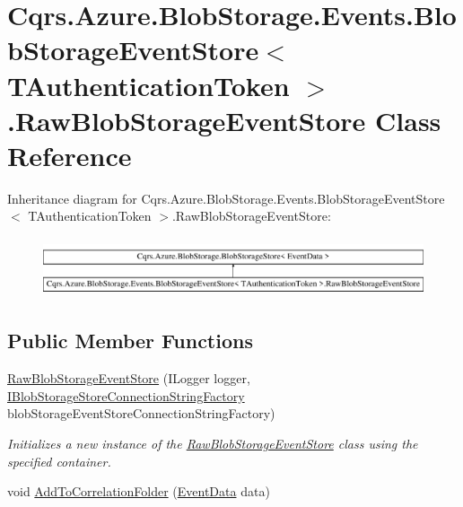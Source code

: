 \hypertarget{classCqrs_1_1Azure_1_1BlobStorage_1_1Events_1_1BlobStorageEventStore_1_1RawBlobStorageEventStore}{}\section{Cqrs.\+Azure.\+Blob\+Storage.\+Events.\+Blob\+Storage\+Event\+Store$<$ T\+Authentication\+Token $>$.Raw\+Blob\+Storage\+Event\+Store Class Reference}
\label{classCqrs_1_1Azure_1_1BlobStorage_1_1Events_1_1BlobStorageEventStore_1_1RawBlobStorageEventStore}
Inheritance diagram for Cqrs.\+Azure.\+Blob\+Storage.\+Events.\+Blob\+Storage\+Event\+Store$<$ T\+Authentication\+Token $>$.Raw\+Blob\+Storage\+Event\+Store\+:\begin{figure}[H]
\begin{center}
\leavevmode
\includegraphics[height=1.755486cm]{classCqrs_1_1Azure_1_1BlobStorage_1_1Events_1_1BlobStorageEventStore_1_1RawBlobStorageEventStore}
\end{center}
\end{figure}
\subsection*{Public Member Functions}
\begin{DoxyCompactItemize}
\item 
\hyperlink{classCqrs_1_1Azure_1_1BlobStorage_1_1Events_1_1BlobStorageEventStore_1_1RawBlobStorageEventStore_a42832e52a20eeb7012526624181f457c_a42832e52a20eeb7012526624181f457c}{Raw\+Blob\+Storage\+Event\+Store} (I\+Logger logger, \hyperlink{interfaceCqrs_1_1Azure_1_1BlobStorage_1_1IBlobStorageStoreConnectionStringFactory}{I\+Blob\+Storage\+Store\+Connection\+String\+Factory} blob\+Storage\+Event\+Store\+Connection\+String\+Factory)
\begin{DoxyCompactList}\small\item\em Initializes a new instance of the \hyperlink{classCqrs_1_1Azure_1_1BlobStorage_1_1Events_1_1BlobStorageEventStore_1_1RawBlobStorageEventStore}{Raw\+Blob\+Storage\+Event\+Store} class using the specified container. \end{DoxyCompactList}\item 
void \hyperlink{classCqrs_1_1Azure_1_1BlobStorage_1_1Events_1_1BlobStorageEventStore_1_1RawBlobStorageEventStore_ab23a500302bfa1a04a2150c79f67e452_ab23a500302bfa1a04a2150c79f67e452}{Add\+To\+Correlation\+Folder} (\hyperlink{classCqrs_1_1Events_1_1EventData}{Event\+Data} data)
\end{DoxyCompactItemize}
